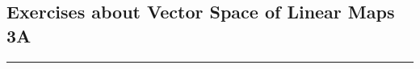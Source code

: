 \subsection*{Exercises about Vector Space of Linear Maps 3A}
\hrule
\phantom{.}

\setcounter{xrcs}{11}
%
%

